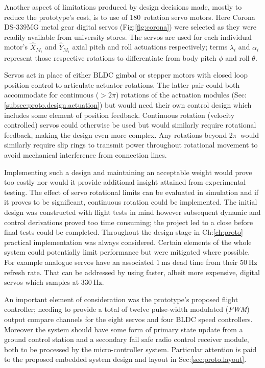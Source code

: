 \par
Another aspect of limitations produced by design decisions made, mostly to reduce the prototype's cost, is to use of 180\textdegree ~rotation servo motors. Here Corona DS-339MG metal gear digital servos (Fig:\ref{fig:corona}) were selected as they were readily available from university stores. The servos are used for each individual motor's $\hat{X}_{M_i}$ and $\hat{Y}_{M_i}$ axial pitch and roll actuations respectively; terms $\lambda_i$ and $\alpha_i$ represent those respective rotations to differentiate from body pitch $\phi$ and roll $\theta$.
\par
Servos act in place of either BLDC gimbal or stepper motors with closed loop position control to articulate actuator rotations. The latter pair could both accommodate for continuous ($>2\pi$) rotations of the actuation modules (Sec:\ref{subsec:proto.design.actuation}) but would need their own control design which includes some element of position feedback. Continuous rotation (velocity controlled) servos could otherwise be used but would similarly require rotational feedback, making the design even more complex. Any rotations beyond 2$\pi$~would similarly require slip rings to transmit power throughout rotational movement to avoid mechanical interference from connection lines. 
\par
Implementing such a design and maintaining an acceptable weight would prove too costly nor would it provide additional insight attained from experimental testing. The effect of servo rotational limits can be evaluated in simulation and if it proves to be significant, continuous rotation could be implemented. The initial design was constructed with flight tests in mind however subsequent dynamic and control derivations proved too time consuming; the project led to a close before final tests could be completed. Throughout the design stage in Ch:\ref{ch:proto} practical implementation was always considered. Certain elements of the whole system could potentially limit performance but were mitigated where possible. For example analogue servos have an associated $1~\text{ms}$ dead time from their $50~\text{Hz}$ refresh rate. That can be addressed by using faster, albeit more expensive, digital servos which samples at $330~\text{Hz}$. 
\par
An important element of consideration was the prototype's proposed flight controller; needing to provide a total of twelve pulse-width modulated (\emph{PWM}) output compare channels for the eight servos and four BLDC speed controllers.  Moreover the system should have some form of primary state update from a ground control station and a secondary fail safe radio control receiver module, both to be processed by the micro-controller system. Particular attention is paid to the proposed embedded system design and layout in Sec:\ref{sec:proto.layout}.
\newpage
